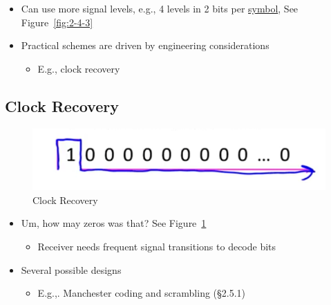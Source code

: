 \documentclass[12pt]{ctexart}   %
\begin{document}
	 \begin{itemize}
	 	\item Can use more signal levels, e.g., 4 levels in 2 bits per \underline{symbol}, See Figure~\ref{fig:2-4-3}
	 	\item Practical schemes are driven by engineering considerations
	 	\begin{itemize}
	 		\item E.g., clock recovery
	 	\end{itemize}
	 \end{itemize}
	 
	 \subsection{Clock Recovery}
	 \begin{figure}[h!] %
	 \centering
	 \includegraphics[scale=0.7]{images/2-4-4}
	\caption{ Clock Recovery}
	 \label{fig:2-4-4}
	 \end{figure}
	 
	 \begin{itemize}
	 	\item Um, how may zeros was that? See Figure~\ref{fig:2-4-4}
	 	\begin{itemize}
	 		\item Receiver needs frequent signal transitions to decode bits
	 	\end{itemize}
	 	
	 	\item Several possible designs
	 	\begin{itemize}
	 		\item E.g.,. Manchester coding and scrambling (§2.5.1)
	 	\end{itemize}
	 \end{itemize}
	
\end{document}
